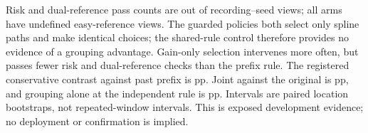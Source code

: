 Risk and dual-reference pass counts are out of \NestedSplineViews{}
recording--seed views; all arms have \NestedSplineUndefined{}
undefined easy-reference views. The guarded policies both select
only \NestedSplineJointUses{} spline paths and make identical choices;
the shared-rule control therefore provides no evidence of a grouping
advantage. Gain-only selection intervenes more often, but passes fewer
risk and dual-reference checks than the prefix rule. The registered conservative contrast
against past prefix is \NestedSplinePrimary{} pp. Joint against the
original is \NestedSplineAgainstAnchor{} pp, and grouping alone at the
independent rule is \NestedSplineGrouping{} pp. Intervals are paired
location bootstraps, not repeated-window intervals. This is exposed
development evidence; no deployment or confirmation is implied.
